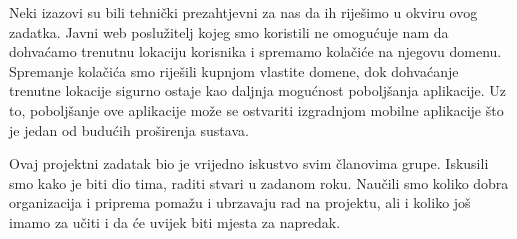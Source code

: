 		Neki izazovi su bili tehnički prezahtjevni za nas da ih riješimo u okviru ovog zadatka. Javni web poslužitelj kojeg smo koristili ne omogućuje nam da dohvaćamo trenutnu lokaciju korisnika i spremamo kolačiće na njegovu domenu. Spremanje kolačića smo riješili kupnjom vlastite domene, dok dohvaćanje trenutne lokacije sigurno ostaje kao daljnja mogućnost poboljšanja aplikacije. Uz to, poboljšanje ove aplikacije može se ostvariti izgradnjom mobilne aplikacije što je jedan od budućih proširenja sustava.
		
		Ovaj projektni zadatak bio je vrijedno iskustvo svim članovima grupe. Iskusili smo kako je biti dio tima, raditi stvari u zadanom roku. Naučili smo koliko dobra organizacija i priprema pomažu i ubrzavaju rad na projektu, ali i koliko još imamo za učiti i da će uvijek biti mjesta za napredak.
		
		\eject 